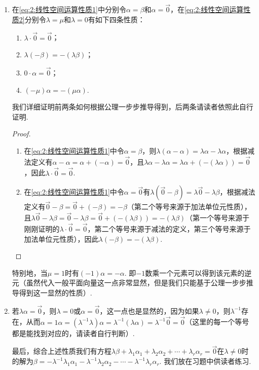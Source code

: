 \begin{enumerate}
\begin{enumerate}
        \item 在\autoref{eq:2:线性空间运算性质1}中分别令$\alpha=\beta$和$\alpha=\vec{0}$，在\autoref{eq:2:线性空间运算性质2}分别令$\lambda=\mu$和$\lambda=0$有如下四条性质：
        \begin{enumerate}
            \item $\lambda\cdot \vec{0}=\vec{0}$；

            \item $\lambda(-\beta)=-(\lambda\beta)$；

            \item $0\cdot \alpha=\vec{0}$；

            \item $(-\mu)\alpha=-(\mu\alpha)$.
        \end{enumerate}
        我们详细证明前两条如何根据公理一步步推导得到，后两条请读者依照此自行证明.
        \begin{proof}
            \begin{enumerate}
                \item 在\autoref{eq:2:线性空间运算性质1}中令$\alpha=\beta$，则$\lambda(\alpha-\alpha)=\lambda\alpha-\lambda\alpha$，根据减法定义有$\alpha-\alpha=\alpha+(-\alpha)=\vec{0}$，且$\lambda\alpha-\lambda\alpha=\lambda\alpha+(-(\lambda\alpha))=\vec{0}$，因此$\lambda\cdot \vec{0}=\vec{0}$.
                \item 在\autoref{eq:2:线性空间运算性质1}中令$\alpha=\vec{0}$有$\lambda(\vec{0}-\beta)=\lambda\vec{0}-\lambda\beta$，根据减法定义有$\vec{0}-\beta=\vec{0}+(-\beta)=-\beta$（第二个等号来源于加法单位元性质），且$\lambda\vec{0}-\lambda\beta=\vec{0}-\lambda\beta=\vec{0}+(-(\lambda\beta))=-(\lambda\beta)$（第一个等号来源于刚刚证明的$\lambda\cdot \vec{0}=\vec{0}$，第二个等号来源于减法的定义，第三个等号来源于加法单位元性质），因此$\lambda(-\beta)=-(\lambda\beta)$.
            \end{enumerate}
        \end{proof}
        特别地，当$\mu=1$时有$(-1)\alpha=-\alpha$. 即$-1$数乘一个元素可以得到该元素的逆元（虽然代入一般平面向量这一点非常显然，但是我们只能基于公理一步步推导得到这一显然的性质）.
        \item 若$\lambda\alpha=\vec{0}$，则$\lambda=0$或$\alpha=\vec{0}$，这一点也是显然的，因为如果$\lambda\neq 0$，则$\lambda^{-1}$存在，从而$\alpha=1\alpha=(\lambda^{-1}\lambda)\alpha=\lambda^{-1}(\lambda\alpha)=\lambda^{-1}\vec{0}=\vec{0}$（这里的每一个等号都是能找到对应的，请读者自行判断）.

        最后，综合上述性质我们有方程$\lambda\beta+\lambda_1\alpha_1+\lambda_2\alpha_2+\cdots+\lambda_r\alpha_r=\vec{0}$在$\lambda\neq 0$时的解为$\beta=-\lambda^{-1}\lambda_1\alpha_1-\lambda^{-1}\lambda_2\alpha_2-\cdots-\lambda^{-1}\lambda_r\alpha_r$. 我们放在习题中供读者练习.
    \end{enumerate}
\end{enumerate}

